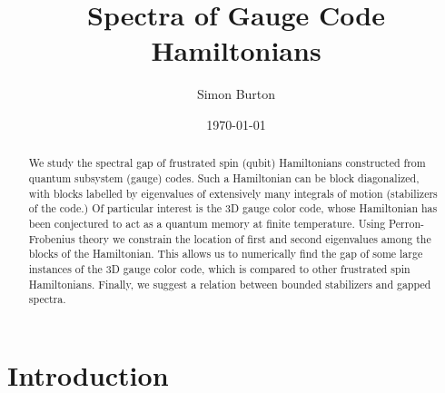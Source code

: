 \documentclass[11pt,oneside]{article}
\title{Spectra of Gauge Code Hamiltonians}
\author{Simon Burton}
\date{\today}
\begin{document}
\maketitle

\begin{abstract}
We study the spectral gap of frustrated spin (qubit)
Hamiltonians constructed from quantum subsystem (gauge) codes.
Such a Hamiltonian can be block diagonalized, with
blocks labelled by eigenvalues of extensively many
integrals of motion (stabilizers of the code.)
Of particular interest is the 3D gauge color code,
whose Hamiltonian has been conjectured to act as a quantum
memory at finite temperature. 
Using Perron-Frobenius theory we constrain the
location of first and second eigenvalues among the
blocks of the Hamiltonian.
This allows us to numerically find the gap of some large instances
of the 3D gauge color code, which is compared to 
other frustrated spin Hamiltonians.
Finally, we suggest a relation between bounded 
stabilizers and gapped spectra.
\end{abstract}




\section{Introduction}
\end{document}

